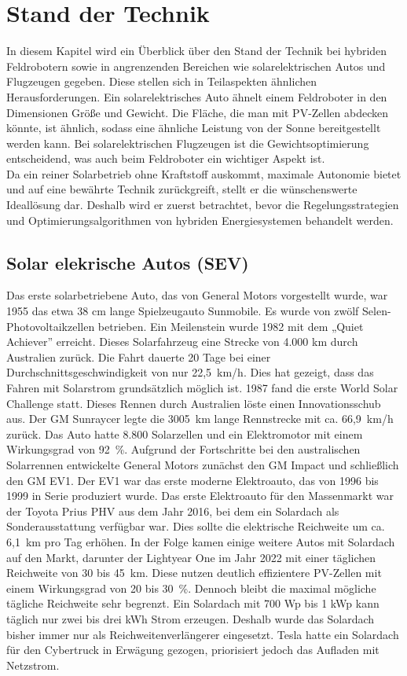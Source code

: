 \section{Stand der Technik}
In diesem Kapitel wird ein Überblick über den Stand der Technik bei hybriden Feldrobotern sowie in angrenzenden Bereichen wie solarelektrischen Autos und Flugzeugen gegeben. Diese stellen sich in Teilaspekten ähnlichen Herausforderungen. Ein solarelektrisches Auto ähnelt einem Feldroboter in den Dimensionen Größe und Gewicht. Die Fläche, die man mit PV-Zellen abdecken könnte, ist ähnlich, sodass eine ähnliche Leistung von der Sonne bereitgestellt werden kann. Bei solarelektrischen Flugzeugen ist die Gewichtsoptimierung entscheidend, was auch beim Feldroboter ein wichtiger Aspekt ist. \\
Da ein reiner Solarbetrieb ohne Kraftstoff auskommt, maximale Autonomie bietet und auf eine bewährte Technik zurückgreift, stellt er die wünschenswerte Ideallösung dar. Deshalb wird er zuerst betrachtet, bevor die Regelungsstrategien und Optimierungsalgorithmen von hybriden Energiesystemen behandelt werden.


\subsection{Solar elekrische Autos (SEV)}
Das erste solarbetriebene Auto, das von General Motors vorgestellt wurde, war 1955 das etwa 38 cm lange Spielzeugauto Sunmobile.
Es wurde von zwölf Selen-Photovoltaikzellen betrieben.
Ein Meilenstein wurde 1982 mit dem „Quiet Achiever” erreicht. Dieses Solarfahrzeug eine Strecke von 4.000 km durch Australien zurück. Die Fahrt dauerte 20 Tage bei einer Durchschnittsgeschwindigkeit von nur 22,5~km/h. Dies hat gezeigt, dass das Fahren mit Solarstrom grundsätzlich möglich ist.
1987 fand die erste World Solar Challenge statt. Dieses Rennen durch Australien löste einen Innovationsschub aus. Der GM Sunraycer legte die 3005~km lange Rennstrecke mit ca. 66,9~km/h zurück. Das Auto hatte 8.800 Solarzellen und ein Elektromotor mit einem Wirkungsgrad von 92~\%.
Aufgrund der Fortschritte bei den australischen Solarrennen entwickelte General Motors zunächst den GM Impact und schließlich den GM EV1. Der EV1 war das erste moderne Elektroauto, das von 1996 bis 1999 in Serie produziert wurde.
Das erste Elektroauto für den Massenmarkt war der Toyota Prius PHV aus dem Jahr 2016, bei dem ein Solardach als Sonderausstattung verfügbar war. Dies sollte die elektrische Reichweite um ca. 6,1~km pro Tag erhöhen. 
In der Folge kamen einige weitere Autos mit Solardach auf den Markt, darunter der Lightyear One im Jahr 2022 mit einer täglichen Reichweite von 30 bis 45~km. Diese nutzen deutlich effizientere PV-Zellen mit einem Wirkungsgrad von 20 bis 30~\%. 
Dennoch bleibt die maximal mögliche tägliche Reichweite sehr begrenzt. Ein Solardach mit 700 Wp bis 1 kWp kann täglich nur zwei bis drei kWh Strom erzeugen. Deshalb wurde das Solardach bisher immer nur als Reichweitenverlängerer eingesetzt. 
Tesla hatte ein Solardach für den Cybertruck in Erwägung gezogen, priorisiert jedoch das Aufladen mit Netzstrom. \cite{oluwalana_solar-powered-cars_2025} 


